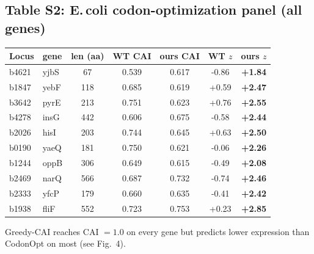\subsection{Table S2: E.\,coli codon-optimization panel (all genes)}
\begin{center}\small\begin{tabular}{llc|cc|cc}\hline\hline
Locus & gene & len (aa) & WT CAI & ours CAI & WT $z$ & ours $z$\\\hline
b4621 & yjbS & 67 & 0.539 & 0.617 & -0.86 & \textbf{+1.84}\\
b1847 & yebF & 118 & 0.685 & 0.619 & +0.59 & \textbf{+2.47}\\
b3642 & pyrE & 213 & 0.751 & 0.623 & +0.76 & \textbf{+2.55}\\
b4278 & insG & 442 & 0.606 & 0.675 & -0.58 & \textbf{+2.44}\\
b2026 & hisI & 203 & 0.744 & 0.645 & +0.63 & \textbf{+2.50}\\
b0190 & yaeQ & 181 & 0.750 & 0.621 & -0.06 & \textbf{+2.26}\\
b1244 & oppB & 306 & 0.649 & 0.615 & -0.49 & \textbf{+2.08}\\
b2469 & narQ & 566 & 0.687 & 0.732 & -0.74 & \textbf{+2.46}\\
b2333 & yfcP & 179 & 0.660 & 0.635 & -0.41 & \textbf{+2.42}\\
b1938 & fliF & 552 & 0.723 & 0.753 & +0.23 & \textbf{+2.85}\\
\hline\hline\end{tabular}\end{center}
Greedy-CAI reaches CAI $=1.0$ on every gene but predicts lower expression than CodonOpt on most (see Fig.~4).
